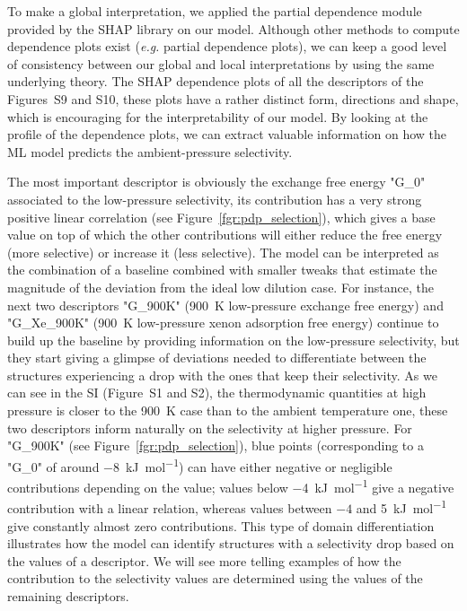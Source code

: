 \documentclass[main]{subfiles}
\begin{document}
To make a global interpretation, we applied the partial dependence module provided by the SHAP library on our model. Although other methods to compute dependence plots exist (\emph{e.g.} partial dependence plots),\autocite{molnar2020interpretable} we can keep a good level of consistency between our global and local interpretations by using the same underlying theory. The SHAP dependence plots of all the descriptors of the Figures~S9 and S10, these plots have a rather distinct form, directions and shape, which is encouraging for the interpretability of our model. By looking at the profile of the dependence plots, we can extract valuable information on how the ML model predicts the ambient-pressure selectivity.

The most important descriptor is obviously the exchange free energy "G\_0" associated to the low-pressure selectivity, its contribution has a very strong positive linear correlation (see Figure~\ref{fgr:pdp_selection}), which gives a base value on top of which the other contributions will either reduce the free energy (more selective) or increase it (less selective). The model can be interpreted as the combination of a baseline combined with smaller tweaks that estimate the magnitude of the deviation from the ideal low dilution case. For instance, the next two descriptors "G\_900K" (\SI{900}{\kelvin} low-pressure exchange free energy) and "G\_Xe\_900K" (\SI{900}{\kelvin} low-pressure xenon adsorption free energy) continue to build up the baseline by providing information on the low-pressure selectivity, but they start giving a glimpse of deviations needed to differentiate between the structures experiencing a drop with the ones that keep their selectivity. As we can see in the SI (Figure~S1 and S2), the thermodynamic quantities at high pressure is closer to the \SI{900}{\kelvin} case than to the ambient temperature one, these two descriptors inform naturally on the selectivity at higher pressure. For "G\_900K" (see Figure~\ref{fgr:pdp_selection}), blue points (corresponding to a "G\_0" of around \SI{-8}{\kilo\joule\per\mole}) can have either negative or negligible contributions depending on the value; values below \SI{-4}{\kilo\joule\per\mole} give a negative contribution with a linear relation, whereas values between $-4$ and \SI{5}{\kilo\joule\per\mole} give constantly almost zero contributions. This type of domain differentiation illustrates how the model can identify structures with a selectivity drop based on the values of a descriptor. We will see more telling examples of how the contribution to the selectivity values are determined using the values of the remaining descriptors.
\end{document}
